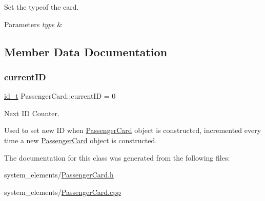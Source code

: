 Set the typeof the card. 


\begin{DoxyParams}{Parameters}
{\em type} & \\
\hline
\end{DoxyParams}


\subsection{Member Data Documentation}
\mbox{\label{classPassengerCard_af557a01fde14b95c0e0b355e777e2aec}} 
\subsubsection{\texorpdfstring{current\+ID}{currentID}}
{\footnotesize\ttfamily \mbox{\hyperlink{project__utils_8h_a8f3a969054ad2200720b96e7e23dd4e1}{id\+\_\+t}} Passenger\+Card\+::current\+ID = 0\hspace{0.3cm}{\ttfamily [static]}}



Next ID Counter. 

Used to set new ID when \mbox{\hyperlink{classPassengerCard}{Passenger\+Card}} object is constructed, incremented every time a new \mbox{\hyperlink{classPassengerCard}{Passenger\+Card}} object is constructed. 

The documentation for this class was generated from the following files\+:\begin{DoxyCompactItemize}
\item 
system\+\_\+elements/\mbox{\hyperlink{PassengerCard_8h}{Passenger\+Card.\+h}}\item 
system\+\_\+elements/\mbox{\hyperlink{PassengerCard_8cpp}{Passenger\+Card.\+cpp}}\end{DoxyCompactItemize}

